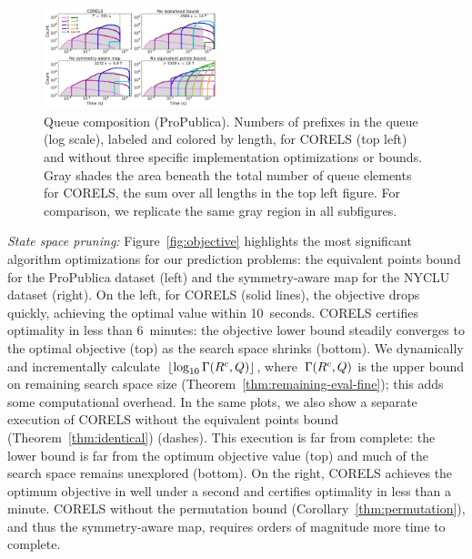 \begin{figure}[t!]
\begin{center}
\includegraphics[trim={10mm 15mm 10mm 30mm},
width=0.45\textwidth]{figs/kdd_compas_ablation_small-queue.pdf}
\end{center}
\caption{Queue composition (ProPublica).
%
Numbers of prefixes in the queue (log scale), labeled and colored by length,
for CORELS (top left) and without three specific implementation optimizations or bounds.
%
Gray shades the area beneath the total number of
queue elements for CORELS,
\ie the sum over all lengths in the top left figure.
%
For comparison, we replicate the same gray region in all subfigures.
}
\label{fig:queue}
\end{figure}


\textit{State space pruning:}
Figure~\ref{fig:objective} highlights the most significant
algorithm optimizations for our prediction problems:
the equivalent points bound for the ProPublica dataset (left)
and the symmetry-aware map for the NYCLU dataset (right).
%
On the left, for CORELS (solid lines),
the objective drops quickly, achieving the optimal value within 10~seconds.
%
CORELS certifies optimality in less than 6~minutes:
the objective lower bound steadily converges to the optimal objective (top)
as the search space shrinks (bottom).
%
We dynamically and incrementally
calculate~$\lfloor \log_{10} \Gamma({R^c}, Q) \rfloor$,
where~$\Gamma({R^c}, Q)$
is the upper bound on remaining search space size
(Theorem~\ref{thm:remaining-eval-fine});
this adds some computational overhead.
%
In the same plots, we also show
a separate execution of CORELS without the equivalent points bound
(Theorem~\ref{thm:identical}) (dashes).
%
This execution is far from complete:
the lower bound is far from the optimum objective value (top)
and much of the search space remains unexplored (bottom).
%
On the right,
CORELS achieves the optimum objective in well under a second
and certifies optimality in less than a minute.
%
CORELS without the permutation bound (Corollary~\ref{thm:permutation}),
and thus the symmetry-aware map,
requires orders of magnitude more time to complete.

